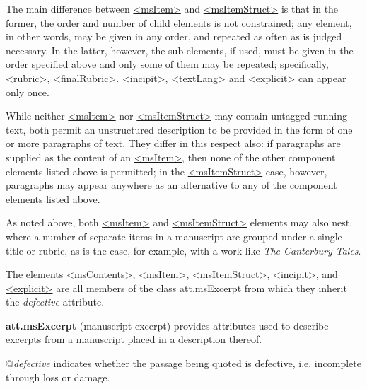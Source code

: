 The main difference between \hyperref[TEI.msItem]{<msItem>} and \hyperref[TEI.msItemStruct]{<msItemStruct>} is that in the former, the order and number of child elements is not constrained; any element, in other words, may be given in any order, and repeated as often as is judged necessary. In the latter, however, the sub-elements, if used, must be given in the order specified above and only some of them may be repeated; specifically, \hyperref[TEI.rubric]{<rubric>}, \hyperref[TEI.finalRubric]{<finalRubric>}. \hyperref[TEI.incipit]{<incipit>}, \hyperref[TEI.textLang]{<textLang>} and \hyperref[TEI.explicit]{<explicit>} can appear only once.\par
While neither \hyperref[TEI.msItem]{<msItem>} nor \hyperref[TEI.msItemStruct]{<msItemStruct>} may contain untagged running text, both permit an unstructured description to be provided in the form of one or more paragraphs of text. They differ in this respect also: if paragraphs are supplied as the content of an \hyperref[TEI.msItem]{<msItem>}, then none of the other component elements listed above is permitted; in the \hyperref[TEI.msItemStruct]{<msItemStruct>} case, however, paragraphs may appear anywhere as an alternative to any of the component elements listed above.\par
As noted above, both \hyperref[TEI.msItem]{<msItem>} and \hyperref[TEI.msItemStruct]{<msItemStruct>} elements may also nest, where a number of separate items in a manuscript are grouped under a single title or rubric, as is the case, for example, with a work like \textit{The Canterbury Tales}.\par
The elements \hyperref[TEI.msContents]{<msContents>}, \hyperref[TEI.msItem]{<msItem>}, \hyperref[TEI.msItemStruct]{<msItemStruct>}, \hyperref[TEI.incipit]{<incipit>}, and \hyperref[TEI.explicit]{<explicit>} are all members of the class \textsf{att.msExcerpt} from which they inherit the {\itshape defective} attribute. 
\begin{sansreflist}
  
\item [\textbf{att.msExcerpt}] (manuscript excerpt) provides attributes used to describe excerpts from a manuscript placed in a description thereof.\hfil\\[-10pt]\begin{sansreflist}
    \item[@{\itshape defective}]
  indicates whether the passage being quoted is defective, i.e. incomplete through loss or damage.
\end{sansreflist}  
\end{sansreflist}

